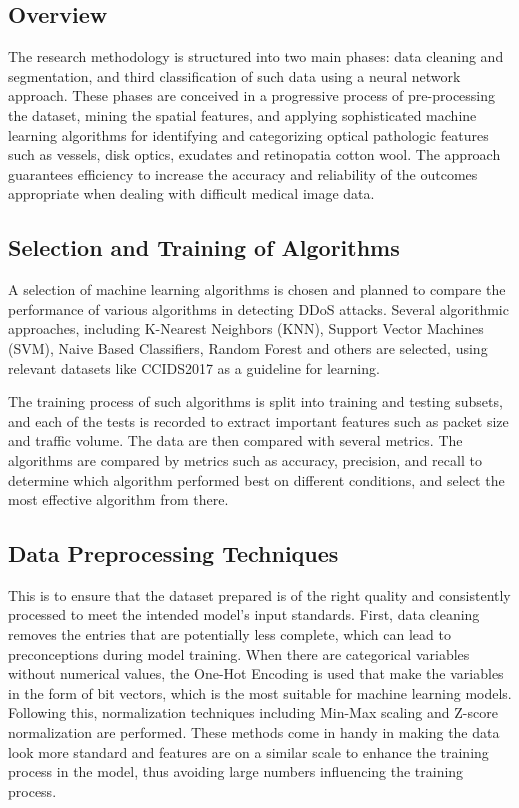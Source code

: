 \documentclass[a4paper, 12pt]{article}
\begin{document}
\subsection{Overview}
The research methodology is structured into two main phases: data cleaning and segmentation, and third classification of such data using a neural network approach. These phases are conceived in a progressive process of pre-processing the dataset, mining the spatial features, and applying sophisticated machine learning algorithms for identifying and categorizing optical pathologic features such as vessels, disk optics, exudates and retinopatia cotton wool. The approach guarantees efficiency to increase the accuracy and reliability of the outcomes appropriate when dealing with difficult medical image data.


\subsection{ Selection and Training of Algorithms }

A selection of machine learning algorithms is chosen and planned to compare the performance of various algorithms in detecting DDoS attacks. Several algorithmic approaches, including K-Nearest Neighbors (KNN), Support Vector Machines (SVM), Naive Based Classifiers, Random Forest and others are selected, using relevant datasets like CCIDS2017 as a guideline for learning.  

The training process of such algorithms is split into training and testing subsets, and each of the tests is recorded to extract important features such as packet size and traffic volume. The data are then compared with several metrics. The algorithms are compared by metrics such as accuracy, precision, and recall to determine which algorithm performed best on different conditions, and select the most effective algorithm from there.

\subsection{ Data Preprocessing Techniques }

This is to ensure that the dataset prepared is of the right quality and consistently processed to meet the intended model’s input standards. First, data cleaning removes the entries that are potentially less complete, which can lead to preconceptions during model training. When there are categorical variables without numerical values, the One-Hot Encoding is used that make the variables in the form of bit vectors, which is the most suitable for machine learning models.  Following this, normalization techniques including Min-Max scaling and Z-score normalization are performed. These methods come in handy in making the data look more standard and features are on a similar scale to enhance the training process in the model, thus avoiding large numbers influencing the training process. 
\end{document}
